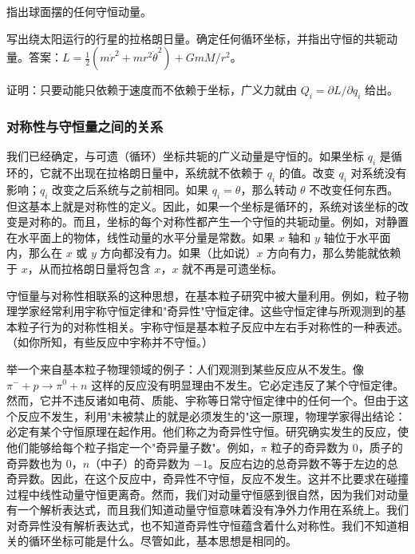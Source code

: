 \begin{exercise}
指出球面摆的任何守恒动量。
\end{exercise}

\begin{exercise}
写出绕太阳运行的行星的拉格朗日量。确定任何循环坐标，并指出守恒的共轭动量。答案：$L = \frac{1}{2}(m\dot{r}^2 + mr^2\dot{\theta}^2) + GmM/r^2$。
\end{exercise}

\begin{exercise}
证明：只要动能只依赖于速度而不依赖于坐标，广义力就由 $Q_i = \partial L/\partial q_i$ 给出。
\end{exercise}

\subsubsection*{对称性与守恒量之间的关系}

我们已经确定，与可遗（循环）坐标共轭的广义动量是守恒的。如果坐标 $q_i$ 是循环的，它就不出现在拉格朗日量中，系统就不依赖于 $q_i$ 的值。改变 $q_i$ 对系统没有影响；$q_i$ 改变之后系统与之前相同。如果 $q_i = \theta$，那么转动 $\theta$ 不改变任何东西。但这基本上就是对称性的定义。因此，如果一个坐标是循环的，系统对该坐标的改变是对称的。而且，坐标的每个对称性都产生一个守恒的共轭动量。例如，对静置在水平面上的物体，线性动量的水平分量是常数。如果 $x$ 轴和 $y$ 轴位于水平面内，那么在 $x$ 或 $y$ 方向都没有力。如果（比如说）$x$ 方向有力，那么势能就依赖于 $x$，从而拉格朗日量将包含 $x$，$x$ 就不再是可遗坐标。

守恒量与对称性相联系的这种思想，在基本粒子研究中被大量利用。例如，粒子物理学家经常利用宇称守恒定律和"奇异性"守恒定律。这些守恒定律与所观测到的基本粒子行为的对称性相关。宇称守恒是基本粒子反应中左右手对称性的一种表述。（如你所知，有些反应中宇称并不守恒。）

举一个来自基本粒子物理领域的例子：人们观测到某些反应从不发生。像 $\pi^- + p \to \pi^0 + n$ 这样的反应没有明显理由不发生。它必定违反了某个守恒定律。然而，它并不违反诸如电荷、质能、宇称等日常守恒定律中的任何一个。但由于这个反应不发生，利用"未被禁止的就是必须发生的"这一原理，物理学家得出结论：必定有某个守恒原理在起作用。他们称之为奇异性守恒。研究确实发生的反应，使他们能够给每个粒子指定一个"奇异量子数"。例如，$\pi$ 粒子的奇异数为 0，质子的奇异数也为 0，$n$（中子）的奇异数为 $-1$。反应右边的总奇异数不等于左边的总奇异数。因此，在这个反应中，奇异性不守恒，反应不发生。这并不比要求在碰撞过程中线性动量守恒更离奇。然而，我们对动量守恒感到很自然，因为我们对动量有一个解析表达式，而且我们知道动量守恒意味着没有净外力作用在系统上。我们对奇异性没有解析表达式，也不知道奇异性守恒蕴含着什么对称性。我们不知道相关的循环坐标可能是什么。尽管如此，基本思想是相同的。

